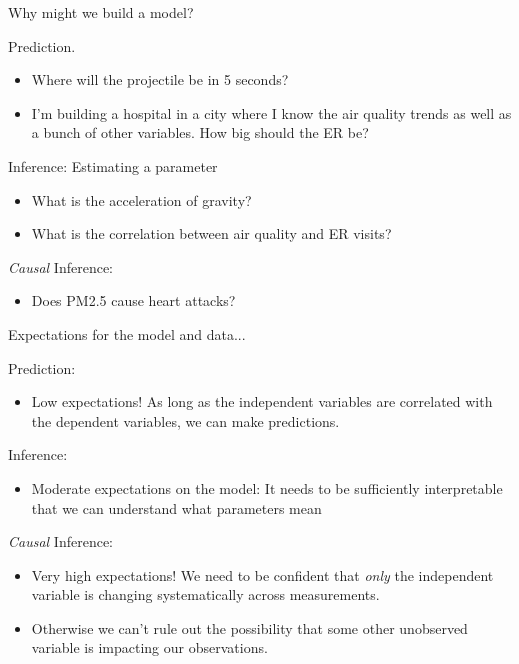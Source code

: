 \documentclass[aspectratio=169, handout]{beamer}
\begin{document}
\begin{frame}{Why might we build a model?}

\pause

Prediction.
\begin{itemize}
\item Where will the projectile be in 5 seconds?
\item I'm building a hospital in a city where I know the air quality trends as well as a bunch of other variables.  How big should the ER be?
\end{itemize}

\hspace{5mm}

Inference: Estimating a parameter
\begin{itemize}
\item What is the acceleration of gravity?
\item What is the correlation between air quality and ER visits?
\end{itemize}

\hspace{5mm}

\textit{Causal }Inference:
\begin{itemize}
\item Does PM2.5 cause heart attacks? 
\end{itemize} 

\end{frame}

\begin{frame}{Expectations for the model and data...}

Prediction:
\begin{itemize}
\item Low expectations! As long as the independent variables are correlated with the dependent variables, we can make predictions.
\end{itemize}
\hspace{2mm}

Inference: 
\begin{itemize}
\item Moderate expectations on the model: It needs to be sufficiently interpretable that we can understand what parameters mean
\end{itemize}
\hspace{2mm}

\textit{Causal }Inference:
\begin{itemize}
\item Very high expectations!  We need to be confident that \textit{only} the independent variable is changing systematically across measurements.  
\item Otherwise we can't rule out the possibility that some other unobserved variable is impacting our observations.
\end{itemize}

\end{frame}
\end{document}
